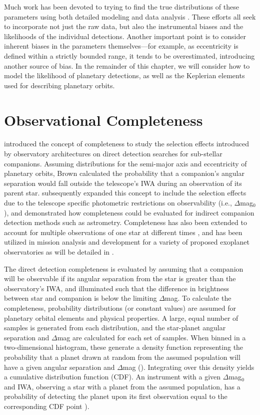 Much work has been devoted to trying to find the true distributions of these parameters using both detailed modeling \citep{currie2009semimajor} and data analysis \citep{hogg2010inferring}.  These efforts all seek to incorporate not just the raw data, but also the instrumental biases and the likelihoods of the individual detections.  Another important point is to consider inherent biases in the parameters themselves---for example, as eccentricity is defined within a strictly bounded range, it tends to be overestimated, introducing another source of bias.  In the remainder of this chapter, we will consider how to model the likelihood of planetary detections, as well as the Keplerian elements used for describing planetary orbits.

\section{Observational Completeness}\label{sec:completeness}
\citet{brown2004a} introduced the concept of completeness to study the selection effects introduced by observatory architectures on direct detection searches for sub-stellar companions.  Assuming distributions for the semi-major axis and eccentricity of planetary orbits, Brown calculated the probability that a companion's angular separation would fall outside the telescope's IWA during an observation of its parent star.  \citet{brown2005} subsequently expanded this concept to include the selection effects due to the telescope specific photometric restrictions on observability (i.e., $\Delta$mag$_0$), and \citet{brown2009} demonstrated how completeness could be evaluated for indirect companion detection methods such as astrometry.  Completeness has also been extended to account for multiple observations of one star at different times \citep{brown2010new}, and has been utilized in mission analysis and development for a variety of proposed exoplanet observatories \citep{savransky2010,brown2009} as will be detailed in .

The direct detection completeness is evaluated by assuming that a companion will be observable if its angular separation from the star is greater than the observatory's IWA, and illuminated such that the difference in brightness between star and companion is below the limiting $\Delta$mag.  To calculate the completeness, probability distributions (or constant values) are assumed for planetary orbital elements and physical properties.  A large, equal number of samples is generated from each distribution, and the star-planet angular separation and $\Delta$mag are calculated for each set of samples.  When binned in a two-dimensional histogram, these generate a density function representing the probability that a planet drawn at random from the assumed population will have a given angular separation and $\Delta$mag ().  Integrating over this density yields a cumulative distribution function (CDF).  An instrument with a given $\Delta$mag$_0$ and IWA, observing a star with a planet from the assumed population, has a probability of detecting the planet upon its first observation equal to the corresponding CDF point ).

